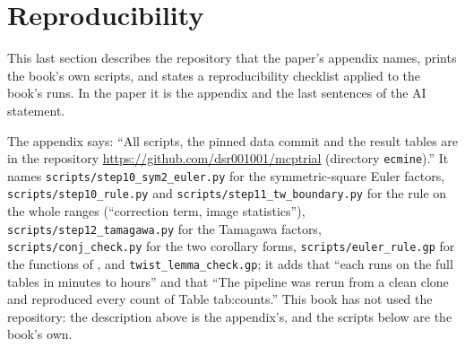 \begin{sloppypar}
\section{Reproducibility}\label{sec:computation:reproducibility}

This last section describes the repository that the paper's appendix names, prints the book's own scripts, and states a reproducibility checklist
applied to the book's runs. In the paper it is the appendix and the last sentences of the AI statement.

\begin{remark}\label{rem:computation:paper-repository}
The appendix says: ``All scripts, the pinned data commit and the result tables are in the repository
\url{https://github.com/dsr001001/mcptrial} (directory \texttt{ecmine}).'' It names \texttt{scripts/step10\_sym2\_euler.py} for the
symmetric-square Euler factors, \texttt{scripts/step10\_rule.py} and \texttt{scripts/step11\_tw\_boundary.py} for the rule on the whole ranges
(``correction term, image statistics''), \texttt{scripts/step12\_tamagawa.py} for the Tamagawa factors, \texttt{scripts/conj\_check.py} for the two
corollary forms, \texttt{scripts/euler\_rule.gp} for the functions of , and \texttt{twist\_lemma\_check.gp}; it adds
that ``each runs on the full tables in minutes to hours'' and that ``The pipeline was rerun from a clean clone and reproduced every count of Table
tab:counts.'' This book has not used the repository: the description above is the appendix's, and the scripts below are the book's own.
\end{remark}


\end{sloppypar}
